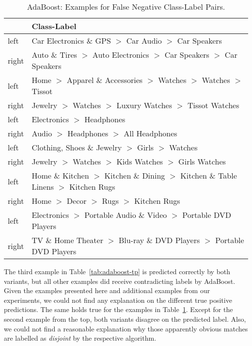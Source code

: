 \begin{table}[htbp]
    \begin{center}
        \begin{tabularx}{\textwidth}{lX}
            & Class-Label \\
            \hline
            left & Car Electronics \& GPS $>$ Car Audio $>$ Car Speakers \\
            right & Auto \& Tires $>$ Auto Electronics $>$ Car Speakers $>$ Car Speakers \\
            \hline
            left & Home $>$ Apparel \& Accessories $>$ Watches $>$ Watches $>$ Tissot \\
            right & Jewelry $>$ Watches $>$ Luxury Watches $>$ Tissot Watches \\
            \hline
            left & Electronics $>$ Headphones \\
            right & Audio $>$ Headphones $>$ All Headphones \\
            \hline
            \hline
            left & Clothing, Shoes \& Jewelry $>$ Girls $>$ Watches \\
            right & Jewelry $>$ Watches $>$ Kids Watches $>$ Girls Watches \\
            \hline
            left & Home \& Kitchen $>$ Kitchen \& Dining $>$ Kitchen \& Table Linens $>$ Kitchen Rugs \\
            right & Home $>$ Decor $>$ Rugs $>$ Kitchen Rugs \\
            \hline
            left & Electronics $>$ Portable Audio \& Video $>$ Portable DVD Players \\
            right & TV \& Home Theater $>$ Blu-ray \& DVD Players $>$ Portable DVD Players \\
        \end{tabularx}
        \caption{AdaBoost: Examples for False Negative Class-Label Pairs.}
        \label{tab:adaboost-fn}
    \end{center}
\end{table}

The third example in Table~\ref{tab:adaboost-tp} is predicted correctly by both variants, but all other examples
did receive contradicting labels by AdaBoost.
Given the examples presented here and additional examples from our experiments, we could not find any explanation
on the different true positive predictions.
The same holds true for the examples in Table~\ref{tab:adaboost-fn}.
Except for the second example from the top, both variants disagree on the predicted label.
Also, we could not find a reasonable explanation why those apparently obvious matches are labelled as \emph{disjoint} by
the respective algorithm.

